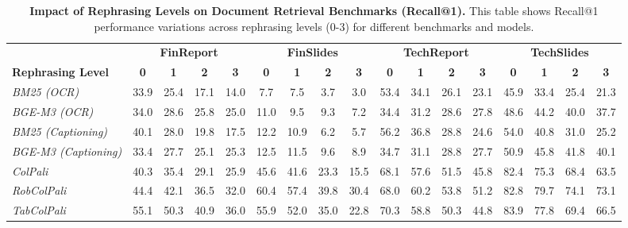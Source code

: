 \begin{table*}[t]
\footnotesize
\renewcommand{\arraystretch}{1.5} %
\setlength\tabcolsep{4pt} %
\caption{
\textbf{Impact of Rephrasing Levels on Document Retrieval Benchmarks (Recall@1).}
This table shows Recall@1 performance variations across rephrasing levels (0-3) for different benchmarks and models.}
\begin{tabular*}{1.03\linewidth}{@{\extracolsep{\fill}}l|cccc|cccc|cccc|cccc} 
\toprule
 & \multicolumn{4}{c|}{\textbf{FinReport}} & \multicolumn{4}{c|}{\textbf{FinSlides}} & \multicolumn{4}{c|}{\textbf{TechReport}} & \multicolumn{4}{c}{\textbf{TechSlides}} \\
\textbf{Rephrasing Level} & \textbf{0} & \textbf{1} & \textbf{2} & \textbf{3} & \textbf{0} & \textbf{1} & \textbf{2} & \textbf{3} & \textbf{0} & \textbf{1} & \textbf{2} & \textbf{3} & \textbf{0} & \textbf{1} & \textbf{2} & \textbf{3} \\
\midrule

\textit{BM25 (OCR)} & 
33.9 & 25.4 & 17.1 & 14.0 &
7.7 & 7.5 & 3.7 & 3.0 &
53.4 & 34.1 & 26.1 & 23.1 &
45.9 & 33.4 & 25.4 & 21.3 \\

\textit{BGE-M3 (OCR)} & 
34.0 & 28.6 & 25.8 & 25.0 &
11.0 & 9.5 & 9.3 & 7.2 &
34.4 & 31.2 & 28.6 & 27.8 &
48.6 & 44.2 & 40.0 & 37.7  \\

\textit{BM25 (Captioning)} & 
40.1 & 28.0 & 19.8 & 17.5 &
12.2 & 10.9 & 6.2 & 5.7 &
56.2 & 36.8 & 28.8 & 24.6 &
54.0 & 40.8 & 31.0 & 25.2 \\

\textit{BGE-M3 (Captioning)} & 
33.4 & 27.7 & 25.1 & 25.3 &
12.5 & 11.5 & 9.6 & 8.9 &
34.7 & 31.1 & 28.8 & 27.7 &
50.9 & 45.8 & 41.8 & 40.1 \\
\addlinespace
\textit{ColPali} & 
40.3 & 35.4 & 29.1 & 25.9 &  
45.6 & 41.6 & 23.3 & 15.5 & 
68.1 & 57.6 & 51.5 & 45.8 & 
82.4 & 75.3 & 68.4 & 63.5 \\

\hspace{0.3cm}\textit{RobColPali} & 
44.4 & 42.1 & 36.5 & 32.0 & 
60.4 & 57.4 & 39.8 & 30.4 & 
68.0 & 60.2 & 53.8 & 51.2 & 
82.8 & 79.7 & 74.1 & 73.1 \\

\hspace{0.3cm}\textit{TabColPali} & 
55.1 & 50.3 & 40.9 & 36.0 & 
55.9 & 52.0 & 35.0 & 22.8 & 
70.3 & 58.8 & 50.3 & 44.8 & 
83.9 & 77.8 & 69.4 & 66.5 \\


\end{tabular*}
\end{table*}
